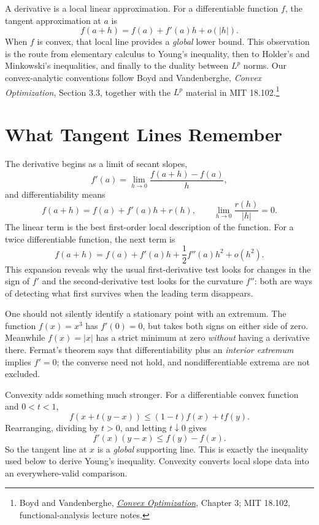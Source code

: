 
A derivative is a local linear approximation. For a differentiable function \(f\), the tangent approximation at \(a\) is
\[
 f(a+h)=f(a)+f'(a)h+o(|h|).
\]
When \(f\) is convex, that local line provides a \emph{global} lower bound. This observation is the route from elementary calculus to Young's inequality, then to Holder's and Minkowski's inequalities, and finally to the duality between \(L^p\) norms. Our convex-analytic conventions follow Boyd and Vandenberghe, \emph{Convex Optimization}, Section 3.3, together with the \(L^p\) material in MIT 18.102.\footnote{Boyd and Vandenberghe, \href{https://web.stanford.edu/~boyd/cvxbook/}{\emph{Convex Optimization}}, Chapter 3; MIT 18.102, functional-analysis lecture notes.}

\section{What Tangent Lines Remember}

The derivative begins as a limit of secant slopes,
\[
 f'(a)=\lim_{h\to0}\frac{f(a+h)-f(a)}h,
\]
and differentiability means
\[
 f(a+h)=f(a)+f'(a)h+r(h),\qquad
 \lim_{h\to0}\frac{r(h)}{|h|}=0.
\]
The linear term is the best first-order local description of the function. For a twice differentiable function, the next term is
\[
 f(a+h)=f(a)+f'(a)h+\frac12f''(a)h^2+o(h^2).
\]
This expansion reveals why the usual first-derivative test looks for changes in the sign of $f'$ and the second-derivative test looks for the curvature $f''$: both are ways of detecting what first survives when the leading term disappears.

One should not silently identify a stationary point with an extremum. The function $f(x)=x^3$ has $f'(0)=0$, but takes both signs on either side of zero. Meanwhile $f(x)=|x|$ has a strict minimum at zero \emph{without} having a derivative there. Fermat's theorem says that differentiability plus an \emph{interior extremum} implies $f'=0$; the converse need not hold, and nondifferentiable extrema are not excluded.

Convexity adds something much stronger. For a differentiable convex function and $0<t<1$,
\[
 f(x+t(y-x))\le(1-t)f(x)+tf(y).
\]
Rearranging, dividing by $t>0$, and letting $t\downarrow0$ gives
\[
 f'(x)(y-x)\le f(y)-f(x).
\]
So the tangent line at $x$ is a \emph{global} supporting line. This is exactly the inequality used below to derive Young's inequality. Convexity converts local slope data into an everywhere-valid comparison.

